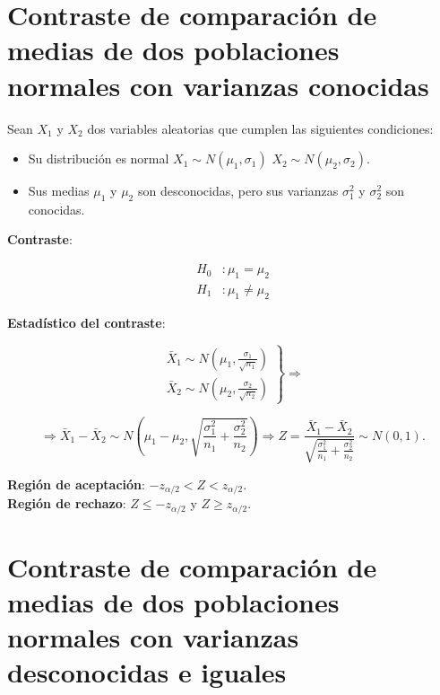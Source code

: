 \documentclass[
  spanish,
  a4paper,
]{scrreport}
\providecommand{\tightlist}{%
  \setlength{\itemsep}{0pt}\setlength{\parskip}{0pt}}
\theoremstyle{plain}
\theoremstyle{definition}
\theoremstyle{definition}
\theoremstyle{remark}
\begin{document}
\section{Contraste de comparación de medias de dos poblaciones normales
con varianzas
conocidas}\label{contraste-de-comparaciuxf3n-de-medias-de-dos-poblaciones-normales-con-varianzas-conocidas}

Sean \(X_1\) y \(X_2\) dos variables aleatorias que cumplen las
siguientes condiciones:

\begin{itemize}
\tightlist
\item
  Su distribución es normal \(X_1\sim N(\mu_1,\sigma_1)\)
  \(X_2\sim N(\mu_2,\sigma_2)\).
\item
  Sus medias \(\mu_1\) y \(\mu_2\) son desconocidas, pero sus varianzas
  \(\sigma^2_1\) y \(\sigma^2_2\) son conocidas.
\end{itemize}

\textbf{Contraste}:

\begin{align*}
H_0 &: \mu_1=\mu_2 \\
H_1 &: \mu_1\neq \mu_2
\end{align*}

\textbf{Estadístico del contraste}:

\[
\left.
\begin{array}{l}
\bar{X}_1\sim N\left(\mu_1,\frac{\sigma_1}{\sqrt{n_1}} \right) \\
\bar{X}_2\sim N\left(\mu_2,\frac{\sigma_2}{\sqrt{n_2}} \right)
\end{array}
\right\}
\Rightarrow
\]

\[
\Rightarrow
\bar{X}_1-\bar{X}_2 \sim N\left(\mu_1-\mu_2,\sqrt{\frac{\sigma^2_1}{n_1}+\frac{\sigma^2_2}{n_2}}\right)
\Rightarrow Z= \frac{\bar{X}_1-\bar{X}_2}{\sqrt{\frac{\sigma^2_1}{n_1}+\frac{\sigma^2_2}{n_2}}}\sim
N(0,1).
\]

\textbf{Región de aceptación}: \(-z_{\alpha/2}< Z < z_{\alpha/2}\).\\
\textbf{Región de rechazo}: \(Z\leq -z_{\alpha/2}\) y
\(Z\geq z_{\alpha/2}\).

\section{Contraste de comparación de medias de dos poblaciones normales
con varianzas desconocidas e
iguales}\label{contraste-de-comparaciuxf3n-de-medias-de-dos-poblaciones-normales-con-varianzas-desconocidas-e-iguales}
\end{document}
